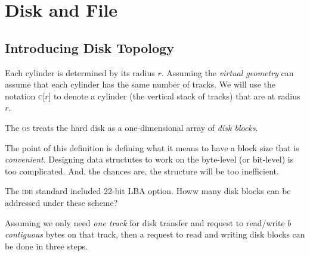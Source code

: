 
\chapter{Disk and File}


\section{Introducing Disk Topology}





Each cylinder is determined by its radius $r$. 
Assuming the \textit{virtual geometry} can assume that each cylinder 
has the same number of tracks. 
We will use the notation \textsc{c}[$r$] to denote a cylinder 
(the vertical stack of tracks) that are at radius $r$. 


The \textsc{os} treats the hard disk as a one-dimensional array of \textit{disk blocks}.


The point of this definition is defining 
what it means to have a block size that is \textit{convenient}.
Designing data structutes to work on the byte-level (or bit-level) is too complicated. 
And, the chances are, the structure will be too inefficient.


\begin{example}
The \textsc{ide} standard included 22-bit LBA option. 
Howw many disk blocks can be addressed under these scheme?
\end{example}


\frmrule

Assuming we only need \textit{one track} for disk transfer and 
request to read/write $b$ \textit{contiguous} bytes on that track, then
a request to read and writing disk blocks can be done in three steps. 

